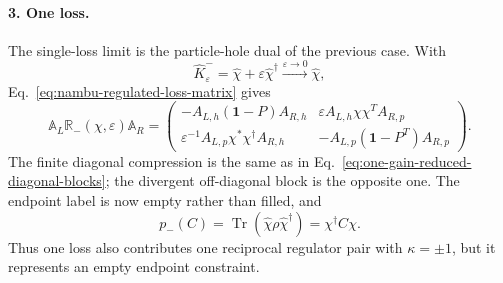 \documentclass[aps,prb,onecolumn,nofootinbib,superscriptaddress]{revtex4-2}
\newcommand{\I}{\mathbf{1}}
\newcommand{\Tr}{\operatorname{Tr}}
\theoremstyle{plain}
\theoremstyle{definition}
\begin{document}
\paragraph*{3. One loss.}
The single-loss limit is the particle-hole dual of the previous case.  With
\begin{equation}
  \hat K_\varepsilon^-
  =
  \hat\chi+\varepsilon\hat\chi^\dagger
  \xrightarrow{\varepsilon\to0}
  \hat\chi ,
  \label{eq:one-loss-regulated-limit}
\end{equation}
Eq.~\eqref{eq:nambu-regulated-loss-matrix} gives
\begin{equation}
  \mathbb A_L\mathbb R_-(\chi,\varepsilon)\mathbb A_R
  =
  \begin{pmatrix}
    -A_{L,h}(\I-P)A_{R,h}
    &
    \varepsilon A_{L,h}\chi\chi^T A_{R,p}
    \\
    \varepsilon^{-1}A_{L,p}\chi^*\chi^\dagger A_{R,h}
    &
    -A_{L,p}(\I-P^T)A_{R,p}
  \end{pmatrix}.
  \label{eq:one-loss-sandwiched-limit}
\end{equation}
The finite diagonal compression is the same as in
Eq.~\eqref{eq:one-gain-reduced-diagonal-blocks}; the divergent off-diagonal
block is the opposite one.  The endpoint label is now empty rather than
filled, and
\begin{equation}
  p_-(C)=\Tr(\hat\chi\rho\hat\chi^\dagger)=\chi^\dagger C\chi .
  \label{eq:one-loss-born-limit}
\end{equation}
Thus one loss also contributes one reciprocal regulator pair with
\(\kappa=\pm1\), but it represents an empty endpoint constraint.
\end{document}

